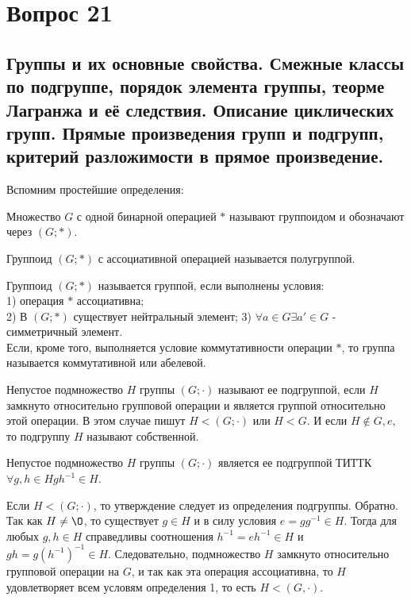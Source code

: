 \section{Вопрос 21}

\subsection{Группы и их основные свойства.
Смежные классы по подгруппе, порядок элемента группы, теорме Лагранжа и её следствия.
Описание циклических групп.
Прямые произведения групп и  подгрупп, критерий разложимости в прямое произведение.
}

Вспомним простейшие определения: \\
\begin{defs}[Группоид]
  Множество $G$ с одной бинарной операцией $*$ называют группоидом и обозначают через $(G;*)$.
\end{defs}

\begin{defs}[Полугруппа]
  Группоид $(G;*)$ с ассоциативной операцией называется полугруппой.
\end{defs}

\begin{defs}[Полугруппа]
  Группоид $(G;*)$ называется группой, если выполнены условия:\\
  1) операция $*$ ассоциативна;\\
  2) В $(G;*)$ существует нейтральный элемент;
  3) $\forall a \in G \exists a' \in G$ - симметричный элемент. \\
  Если, кроме того, выполняется условие коммутативности операции $*$, то группа называется коммутативной или абелевой.
\end{defs}

\begin{defs}[Подгруппа]
  Непустое подмножество $H$ группы $(G;\cdot)$ называют ее подгруппой, если $H$ замкнуто относительно
  групповой операции и является группой относительно этой операции. В этом случае пишут $H < (G;\cdot)$ или $H < G$.
  И если $H \notin {G, {e}}$, то подгруппу $H$ называют собственной.
\end{defs}

\begin{claim}
 Непустое подмножество $H$ группы $(G;\cdot)$ является ее подгруппой ТИТТК $\forall g,h \in H gh^{-1} \in H$.
 \begin{dokvo}
 Если $H < (G;\cdot)$, то утверждение следует из определения подгруппы. Обратно. Так как $H \neq \O$, то существует $g \in H$ и
 в силу условия $e = gg^{-1} \in H$. Тогда для любых $g, h \in H$ справедливы соотношения $h^{-1} = eh^{-1} \in H$ и
 $gh = g(h^{-1})^{-1} \in H$. Следовательно, подмножество $H$ замкнуто относительно групповой операции на $G$, и так как эта
 операция ассоциативна, то $H$ удовлетворяет всем условям определения 1, то есть $H < (G,\cdot)$.
 \end{dokvo}
\end{claim}

